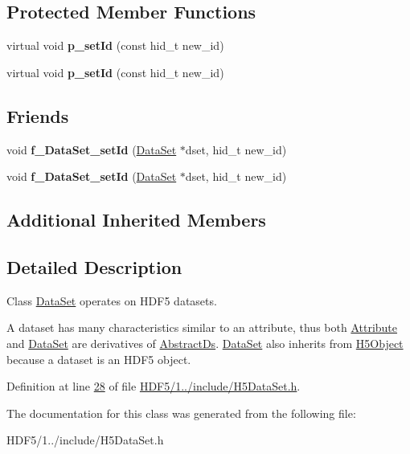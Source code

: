 \subsection*{Protected Member Functions}
\begin{DoxyCompactItemize}
\item 
\mbox{\label{class_h5_1_1_data_set_ab67ee26457964e47b8aa9623f74d5013}} 
virtual void {\bfseries p\+\_\+set\+Id} (const hid\+\_\+t new\+\_\+id)
\item 
\mbox{\label{class_h5_1_1_data_set_ab67ee26457964e47b8aa9623f74d5013}} 
virtual void {\bfseries p\+\_\+set\+Id} (const hid\+\_\+t new\+\_\+id)
\end{DoxyCompactItemize}
\subsection*{Friends}
\begin{DoxyCompactItemize}
\item 
\mbox{\label{class_h5_1_1_data_set_ac7ff248608dd4f8680042d1aa6962fc6}} 
void {\bfseries f\+\_\+\+Data\+Set\+\_\+set\+Id} (\hyperlink{class_h5_1_1_data_set}{Data\+Set} $\ast$dset, hid\+\_\+t new\+\_\+id)
\item 
\mbox{\label{class_h5_1_1_data_set_ac7ff248608dd4f8680042d1aa6962fc6}} 
void {\bfseries f\+\_\+\+Data\+Set\+\_\+set\+Id} (\hyperlink{class_h5_1_1_data_set}{Data\+Set} $\ast$dset, hid\+\_\+t new\+\_\+id)
\end{DoxyCompactItemize}
\subsection*{Additional Inherited Members}


\subsection{Detailed Description}
Class \hyperlink{class_h5_1_1_data_set}{Data\+Set} operates on H\+D\+F5 datasets. 

A dataset has many characteristics similar to an attribute, thus both \hyperlink{class_h5_1_1_attribute}{Attribute} and \hyperlink{class_h5_1_1_data_set}{Data\+Set} are derivatives of \hyperlink{class_h5_1_1_abstract_ds}{Abstract\+Ds}. \hyperlink{class_h5_1_1_data_set}{Data\+Set} also inherits from \hyperlink{class_h5_1_1_h5_object}{H5\+Object} because a dataset is an H\+D\+F5 object. 

Definition at line \hyperlink{_h_d_f5_21_810_81_2include_2_h5_data_set_8h_source_l00028}{28} of file \hyperlink{_h_d_f5_21_810_81_2include_2_h5_data_set_8h_source}{H\+D\+F5/1../include/\+H5\+Data\+Set.\+h}.



The documentation for this class was generated from the following file\+:\begin{DoxyCompactItemize}
\item 
H\+D\+F5/1../include/\+H5\+Data\+Set.\+h\end{DoxyCompactItemize}
